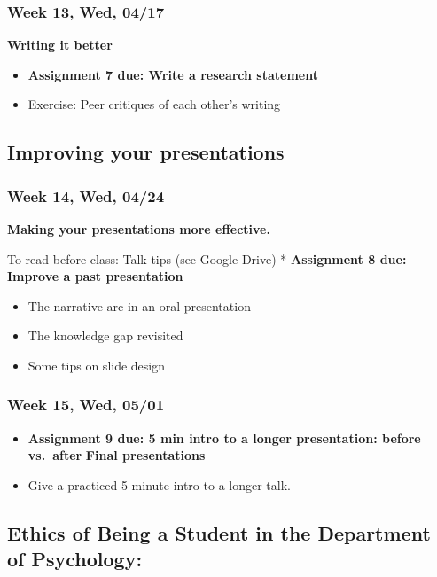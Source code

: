 \documentclass[11pt,man]{article}
\providecommand{\tightlist}{%
  \setlength{\itemsep}{0pt}\setlength{\parskip}{0pt}}
\begin{document}
\subsubsection{Week 13, Wed, 04/17}\label{week-13-wed-0417}

\textbf{Writing it better}

\begin{itemize}
\tightlist
\item
  \textbf{Assignment 7 due: Write a research statement}
\item
  Exercise: Peer critiques of each other's writing
\end{itemize}

\subsection{Improving your
presentations}\label{improving-your-presentations}

\subsubsection{Week 14, Wed, 04/24}\label{week-14-wed-0424}

\textbf{Making your presentations more effective.}

To read before class: Talk tips (see Google Drive) * \textbf{Assignment
8 due: Improve a past presentation}

\begin{itemize}
\tightlist
\item
  The narrative arc in an oral presentation
\item
  The knowledge gap revisited
\item
  Some tips on slide design
\end{itemize}

\subsubsection{Week 15, Wed, 05/01}\label{week-15-wed-0501}

\begin{itemize}
\item
  \textbf{Assignment 9 due: 5 min intro to a longer presentation: before
  vs.~after} \textbf{Final presentations}
\item
  Give a practiced 5 minute intro to a longer talk.
\end{itemize}

\subsection{Ethics of Being a Student in the Department of
Psychology:}\label{ethics-of-being-a-student-in-the-department-of-psychology}
\end{document}
